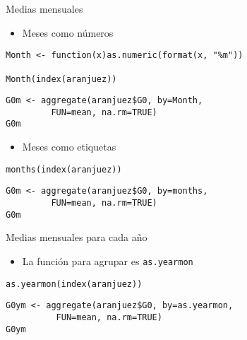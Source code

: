 \documentclass[xcolor={usenames,svgnames,dvipsnames}]{beamer}
\begin{document}
\begin{frame}[fragile,label=sec-3-3]{Medias mensuales}
 \begin{itemize}
\item Meses como números
\end{itemize}
\lstset{language=R,numbers=none}
\begin{lstlisting}
Month <- function(x)as.numeric(format(x, "%m"))

Month(index(aranjuez))
\end{lstlisting}

\lstset{language=R,numbers=none}
\begin{lstlisting}
G0m <- aggregate(aranjuez$G0, by=Month,
		 FUN=mean, na.rm=TRUE)
G0m
\end{lstlisting}

\begin{itemize}
\item Meses como etiquetas
\end{itemize}
\lstset{language=R,numbers=none}
\begin{lstlisting}
months(index(aranjuez))
\end{lstlisting}

\lstset{language=R,numbers=none}
\begin{lstlisting}
G0m <- aggregate(aranjuez$G0, by=months,
		 FUN=mean, na.rm=TRUE)
G0m
\end{lstlisting}
\end{frame}
\begin{frame}[fragile,label=sec-3-4]{Medias mensuales para cada año}
 \begin{itemize}
\item La función para agrupar es \texttt{as.yearmon}
\end{itemize}
\lstset{language=R,numbers=none}
\begin{lstlisting}
as.yearmon(index(aranjuez))
\end{lstlisting}

\lstset{language=R,numbers=none}
\begin{lstlisting}
G0ym <- aggregate(aranjuez$G0, by=as.yearmon,
		  FUN=mean, na.rm=TRUE)
G0ym
\end{lstlisting}
\end{frame}
\end{document}
